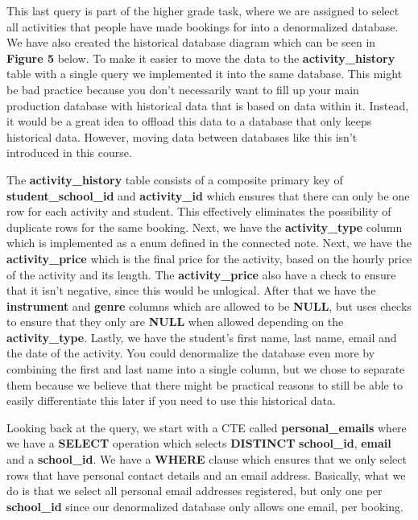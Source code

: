 \documentclass[a4paper]{scrartcl}
\begin{document}
This last query is part of the higher grade task, where we are assigned to select all activities that people have made bookings for into a denormalized database. We have also created the historical database diagram which can be seen in \textbf{Figure 5} below. To make it easier to move the data to the \textbf{activity\_history} table with a single query we implemented it into the same database. This might be bad practice because you don't necessarily want to fill up your main production database with historical data that is based on data within it. Instead, it would be a great idea to offload this data to a database that only keeps historical data. However, moving data between databases like this isn't introduced in this course.

The \textbf{activity\_history} table consists of a composite primary key of \textbf{student\_school\_id} and \textbf{activity\_id} which ensures that there can only be one row for each activity and student. This effectively eliminates the possibility of duplicate rows for the same booking. Next, we have the \textbf{activity\_type} column which is implemented as a enum defined in the connected note. Next, we have the \textbf{activity\_price} which is the final price for the activity, based on the hourly price of the activity and its length. The \textbf{activity\_price} also have a check to ensure that it isn't negative, since this would be unlogical. After that we have the \textbf{instrument} and \textbf{genre} columns which are allowed to be \textbf{NULL}, but uses checks to ensure that they only are \textbf{NULL} when allowed depending on the \textbf{activity\_type}. Lastly, we have the student's first name, last name, email and the date of the activity. You could denormalize the database even more by combining the first and last name into a single column, but we chose to separate them because we believe that there might be practical reasons to still be able to easily differentiate this later if you need to use this historical data.

Looking back at the query, we start with a CTE called \textbf{personal\_emails} where we have a \textbf{SELECT} operation which selects \textbf{DISTINCT} \textbf{school\_id}, \textbf{email} and a \textbf{school\_id}. We have a \textbf{WHERE} clause which ensures that we only select rows that have personal contact details and an email address. Basically, what we do is that we select all personal email addresses registered, but only one per \textbf{school\_id} since our denormalized database only allows one email, per booking.
\end{document}
